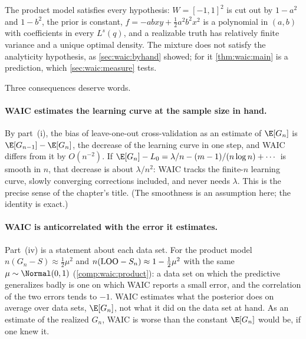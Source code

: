\begin{refsection}
The product model satisfies every hypothesis: $W=[-1,1]^2$ is cut out by $1-a^2$ and $1-b^2$, the prior is constant, $f=-abxy+\tfrac12a^2b^2x^2$ is a polynomial in $(a,b)$ with coefficients in every $L^s(q)$, and a realizable truth has relatively finite variance and a unique optimal density. The mixture does not satisfy the analyticity hypothesis, as \cref{sec:waic:byhand} showed; for it \cref{thm:waic:main} is a prediction, which \cref{sec:waic:measure} tests.

Three consequences deserve words.

\paragraph{WAIC estimates the learning curve at the sample size in hand.} By part~(i), the bias of leave-one-out cross-validation as an estimate of $\E[G_n]$ is $\E[G_{n-1}]-\E[G_n]$, the decrease of the learning curve in one step, and WAIC differs from it by $O(n^{-2})$. If $\E[G_n]-L_0=\lambda/n-(m-1)/(n\log n)+\cdots$ is smooth in $n$, that decrease is about $\lambda/n^2$: WAIC tracks the finite-$n$ learning curve, slowly converging corrections included, and never needs $\lambda$. This is the precise sense of the chapter's title. (The smoothness is an assumption here; the identity is exact.)

\paragraph{WAIC is anticorrelated with the error it estimates.} Part~(iv) is a statement about each data set. For the product model $n(G_n-S)\approx\tfrac12\mu^2$ and $n(\mathrm{LOO}-S_n)\approx1-\tfrac12\mu^2$ with the same $\mu\sim\Normal(0,1)$ (\cref{comp:waic:product}): a data set on which the predictive generalizes badly is one on which WAIC reports a small error, and the correlation of the two errors tends to $-1$. WAIC estimates what the posterior does on average over data sets, $\E[G_n]$, not what it did on the data set at hand. As an estimate of the realized $G_n$, WAIC is worse than the constant $\E[G_n]$ would be, if one knew it.


\end{refsection}
